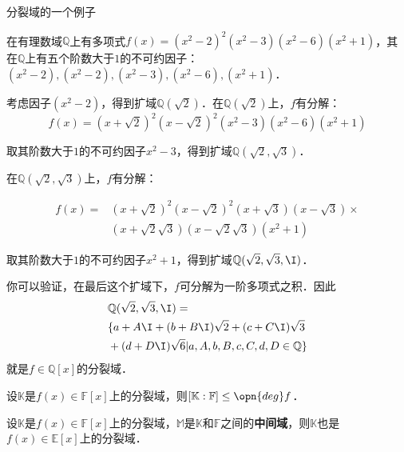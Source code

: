 \begin{example}{分裂域的一个例子}


在有理数域$\mathbb{Q}$上有多项式$f(x)=(x^2-2)^2(x^2-3)(x^2-6)(x^2+1)$，其在$\mathbb{Q}$上有五个阶数大于$1$的不可约因子：$(x^2-2), (x^2-2), (x^2-3), (x^2-6), (x^2+1)$．

考虑因子$(x^2-2)$，得到扩域$\mathbb{Q}(\sqrt{2})$．在$\mathbb{Q}(\sqrt{2})$上，$f$有分解：
\begin{equation}
f(x)=(x+\sqrt{2})^2(x-\sqrt{2})^2(x^2-3)(x^2-6)(x^2+1)
\end{equation}

取其阶数大于$1$的不可约因子$x^2-3$，得到扩域$\mathbb{Q}(\sqrt{2}, \sqrt{3})$．

在$\mathbb{Q}(\sqrt{2}, \sqrt{3})$上，$f$有分解：

\begin{equation}
\begin{aligned}
f(x)=&(x+\sqrt{2})^2(x-\sqrt{2})^2(x+\sqrt{3})(x-\sqrt{3})\times\\
&(x+\sqrt{2}\sqrt{3})(x-\sqrt{2}\sqrt{3})(x^2+1)
\end{aligned}
\end{equation}

取其阶数大于$1$的不可约因子$x^2+1$，得到扩域$\mathbb{Q}(\sqrt{2}, \sqrt{3}, \I)$．

你可以验证，在最后这个扩域下，$f$可分解为一阶多项式之积．因此
\begin{equation}
\begin{aligned}
&\mathbb{Q}(\sqrt{2}, \sqrt{3}, \I)=\\
&\{a+A\I+(b+B\I)\sqrt{2}+(c+C\I)\sqrt{3}\\
&+(d+D\I)\sqrt{6} | a, A, b, B, c, C, d, D\in\mathbb{Q}\}
\end{aligned}
\end{equation}
就是$f\in\mathbb{Q}[x]$的分裂域．

\end{example}

\begin{corollary}{}
设$\mathbb{K}$是$f(x)\in \mathbb{F}[x]$上的分裂域，则$[\mathbb{K}:\mathbb{F}]\leq \opn{deg}f$．
\end{corollary}

\begin{corollary}{}
设$\mathbb{K}$是$f(x)\in \mathbb{F}[x]$上的分裂域，$\mathbb{M}$是$\mathbb{K}$和$\mathbb{F}$之间的\textbf{中间域}，则$\mathbb{K}$也是$f(x)\in \mathbb{E}[x]$上的分裂域．

\end{corollary}


